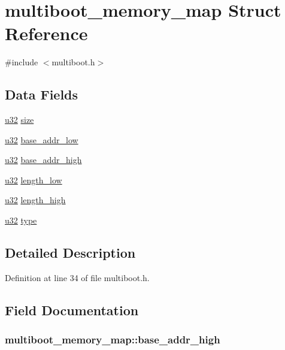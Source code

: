 \hypertarget{structmultiboot__memory__map}{\section{multiboot\-\_\-memory\-\_\-map Struct Reference}
\label{structmultiboot__memory__map}
}


{\ttfamily \#include $<$multiboot.\-h$>$}

\subsection*{Data Fields}
\begin{DoxyCompactItemize}
\item 
\hyperlink{types_8h_a10e94b422ef0c20dcdec20d31a1f5049}{u32} \hyperlink{structmultiboot__memory__map_ac0ad4b16395ba1e3d7101a6aa1be8ec4}{size}
\item 
\hyperlink{types_8h_a10e94b422ef0c20dcdec20d31a1f5049}{u32} \hyperlink{structmultiboot__memory__map_aaf761d2db0b02fc4308e98d5bb6666db}{base\-\_\-addr\-\_\-low}
\item 
\hyperlink{types_8h_a10e94b422ef0c20dcdec20d31a1f5049}{u32} \hyperlink{structmultiboot__memory__map_abb1eaa44de30dceb57df988e5748af93}{base\-\_\-addr\-\_\-high}
\item 
\hyperlink{types_8h_a10e94b422ef0c20dcdec20d31a1f5049}{u32} \hyperlink{structmultiboot__memory__map_a8138f4682dc7e0736759a73edebc114b}{length\-\_\-low}
\item 
\hyperlink{types_8h_a10e94b422ef0c20dcdec20d31a1f5049}{u32} \hyperlink{structmultiboot__memory__map_a2877672a868d3d8f097d0f44790ee1c2}{length\-\_\-high}
\item 
\hyperlink{types_8h_a10e94b422ef0c20dcdec20d31a1f5049}{u32} \hyperlink{structmultiboot__memory__map_a4e1768afd1cc4042b2d202c6e880cb70}{type}
\end{DoxyCompactItemize}


\subsection{Detailed Description}


Definition at line 34 of file multiboot.\-h.



\subsection{Field Documentation}
\hypertarget{structmultiboot__memory__map_abb1eaa44de30dceb57df988e5748af93}{
\subsubsection[{base\-\_\-addr\-\_\-high}]{ multiboot\-\_\-memory\-\_\-map\-::base\-\_\-addr\-\_\-high}}\label{structmultiboot__memory__map_abb1eaa44de30dceb57df988e5748af93}


